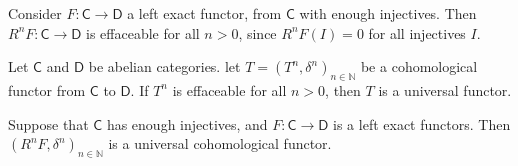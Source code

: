 \documentclass[../Main]{subfiles}
\begin{document}
\begin{rem}[]
	Consider $F\colon \mathsf{C} \to \mathsf{D}$ a left exact functor, from
	$\mathsf{C}$ with enough injectives.
	Then $R^nF\colon \mathsf{C} \to \mathsf{D}$ is effaceable for all $n > 0$,
	since $R^{n}F \left( I \right) = 0$ for all injectives $I$.
\end{rem}


\begin{thm}[]
	Let $\mathsf{C}$ and $\mathsf{D}$ be abelian categories.
	let $T = \left(T^n, \delta^n\right)_{n \in \mathbb{N}}$ be a cohomological
	functor from $\mathsf{C}$ to $\mathsf{D}$.
	If $T^n$ is effaceable for all $n > 0$, then $T$
	is a universal functor.
\end{thm}


\begin{cor}
	Suppose that $\mathsf{C}$ has enough injectives,
	and $F\colon \mathsf{C} \to \mathsf{D}$ is a left exact functors.
	Then $\left(R^{n}F, \delta^n\right)_{n \in \mathbb{N}}$ is a universal
	cohomological functor.
\end{cor} 
\end{document}
